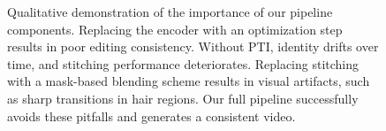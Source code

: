 \begin{figure}
{\begin{tabular}{ccccc}
\end{tabular}
}


\caption{Qualitative demonstration of the importance of our pipeline components. Replacing the encoder with an optimization step results in poor editing consistency. Without PTI, identity drifts over time, and stitching performance deteriorates. Replacing stitching with a mask-based blending scheme results in visual artifacts, such as sharp transitions in hair regions. Our full pipeline successfully avoids these pitfalls and generates a consistent video.}
\label{fig:ablation}
\end{figure}